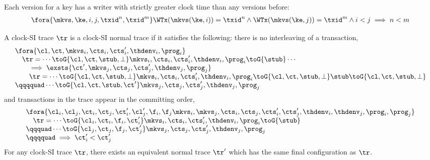 \begin{lemma}
    \label{lem:clock-si-mono-writer}
    Each version for a key has a writer with strictly greater clock time than any versions before:
    \[
        \begin{array}{@{}l@{}}
            \fora{\mkvs,\ke,i,j,\txid^n,\txid^m} 
            \WTx(\mkvs(\ke,i)) = \txid^n 
            \land \WTx(\mkvs(\ke,j)) = \txid^m 
            \land i < j
            \implies 
            n < m
        \end{array}
    \]
\end{lemma}


\begin{theorem}
\label{thm:clock-si-normal-trace}
A clock-SI trace \( \tr \) is a clock-SI normal trace if it satisfies the following:
there is no interleaving of a transaction,
\begin{equation}
    \label{equ:clock-si-no-interleaving}
    \begin{array}{@{}l@{}}
        \fora{\cl,\ct, \mkvs_i, \cts_i, \cts'_i, \thdenv_i, \prog_i} \\
        \quad \tr = \cdots \toG{\cl,\ct,\stub, \perp} \mkvs_i, \cts_i, \cts'_i, \thdenv_i, \prog_i \toG{\stub} \cdots \\
        \qquad \implies \exsts{\ct', \mkvs_j, \cts_j, \cts'_j, \thdenv_j, \prog_j} \\
        \qquad \tr = \cdots \toG{\cl,\ct,\stub, \perp} \mkvs_i, \cts_i, \cts'_i, \thdenv_i, \prog_i \toG{\cl,\ct,\stub, \perp} \stub \toG{\cl,\ct,\stub, \perp} \\
        \qqqquad \cdots \toG{\cl,\ct,\stub,\ct'} \mkvs_j, \cts_j, \cts'_j, \thdenv_j, \prog_j
    \end{array}
\end{equation}
and transactions in the trace appear in the committing order, 
\begin{equation}
    \label{equ:clock-si-commit-order}
    \begin{array}{@{}l@{}}
        \fora{\cl_i,\cl_j,\ct_i, \ct_j, \ct'_i, \cl'_j, \f_i, \f_j \mkvs_i, \mkvs_j, \cts_i, \cts_j, \cts'_i, \cts'_j, \thdenv_i, \thdenv_j,  \prog_i, \prog_j} \\
        \quad \tr = \cdots \toG{\cl_i,\ct_i,\f_i,\ct'_i} \mkvs_i, \cts_i, \cts'_i, \thdenv_i, \prog_i \toG{\stub} \\
        \qqquad \cdots \toG{\cl_j,\ct_j,\f_j,\ct'_j} \mkvs_j, \cts_j, \cts'_j, \thdenv_j, \prog_j \\
        \qqqquad \implies \ct'_i < \ct'_j
    \end{array}
\end{equation}
For any clock-SI trace \( \tr \), there exists an equivalent normal trace \( \tr' \) which has the same final configuration as \( \tr \).
\end{theorem}
